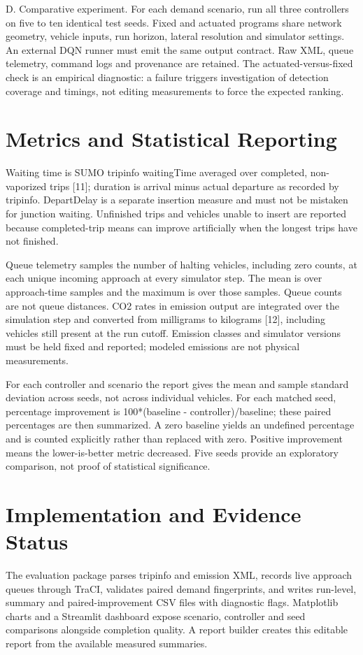\documentclass[conference]{IEEEtran}
\begin{document}
D. Comparative experiment. For each demand scenario, run all three controllers on five to ten identical test seeds. Fixed and actuated programs share network geometry, vehicle inputs, run horizon, lateral resolution and simulator settings. An external DQN runner must emit the same output contract. Raw XML, queue telemetry, command logs and provenance are retained. The actuated-versus-fixed check is an empirical diagnostic: a failure triggers investigation of detection coverage and timings, not editing measurements to force the expected ranking.

\section{Metrics and Statistical Reporting}
Waiting time is SUMO tripinfo waitingTime averaged over completed, non-vaporized trips [11]; duration is arrival minus actual departure as recorded by tripinfo. DepartDelay is a separate insertion measure and must not be mistaken for junction waiting. Unfinished trips and vehicles unable to insert are reported because completed-trip means can improve artificially when the longest trips have not finished.

Queue telemetry samples the number of halting vehicles, including zero counts, at each unique incoming approach at every simulator step. The mean is over approach-time samples and the maximum is over those samples. Queue counts are not queue distances. CO2 rates in emission output are integrated over the simulation step and converted from milligrams to kilograms [12], including vehicles still present at the run cutoff. Emission classes and simulator versions must be held fixed and reported; modeled emissions are not physical measurements.

For each controller and scenario the report gives the mean and sample standard deviation across seeds, not across individual vehicles. For each matched seed, percentage improvement is 100*(baseline - controller)/baseline; these paired percentages are then summarized. A zero baseline yields an undefined percentage and is counted explicitly rather than replaced with zero. Positive improvement means the lower-is-better metric decreased. Five seeds provide an exploratory comparison, not proof of statistical significance.

\section{Implementation and Evidence Status}
The evaluation package parses tripinfo and emission XML, records live approach queues through TraCI, validates paired demand fingerprints, and writes run-level, summary and paired-improvement CSV files with diagnostic flags. Matplotlib charts and a Streamlit dashboard expose scenario, controller and seed comparisons alongside completion quality. A report builder creates this editable report from the available measured summaries.
\end{document}
